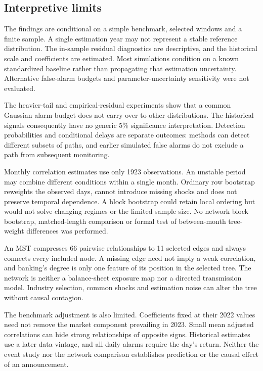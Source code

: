 \documentclass[11pt,a4paper]{article}
\begin{document}
\subsection*{Interpretive limits}
The findings are conditional on a simple benchmark, selected windows and a finite sample. A single estimation year may not represent a stable reference distribution. The in-sample residual diagnostics are descriptive, and the historical scale and coefficients are estimated. Most simulations condition on a known standardized baseline rather than propagating that estimation uncertainty. Alternative false-alarm budgets and parameter-uncertainty sensitivity were not evaluated.

The heavier-tail and empirical-residual experiments show that a common Gaussian alarm budget does not carry over to other distributions. The historical signals consequently have no generic 5\% significance interpretation. Detection probabilities and conditional delays are separate outcomes: methods can detect different subsets of paths, and earlier simulated false alarms do not exclude a path from subsequent monitoring.

Monthly correlation estimates use only 19\textendash{}23 observations. An unstable period may combine different conditions within a single month. Ordinary row bootstrap reweights the observed days, cannot introduce missing shocks and does not preserve temporal dependence. A block bootstrap could retain local ordering but would not solve changing regimes or the limited sample size. No network block bootstrap, matched-length comparison or formal test of between-month tree-weight differences was performed.

An MST compresses 66 pairwise relationships to 11 selected edges and always connects every included node. A missing edge need not imply a weak correlation, and banking's degree is only one feature of its position in the selected tree. The network is neither a balance-sheet exposure map nor a directed transmission model. Industry selection, common shocks and estimation noise can alter the tree without causal contagion.

The benchmark adjustment is also limited. Coefficients fixed at their 2022 values need not remove the market component prevailing in 2023. Small mean adjusted correlations can hide strong relationships of opposite signs. Historical estimates use a later data vintage, and all daily alarms require the day's return. Neither the event study nor the network comparison establishes prediction or the causal effect of an announcement.
\end{document}
